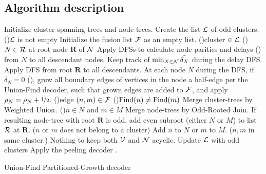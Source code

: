 \subsection{Algorithm description}\label{sec:pseudocode}
\begin{algorithm}[htb]
  \BlankLine
  \BlankLine
  Initialize cluster spanning-trees and node-trees.\;\label{algo:B1a}%
  Create the list $\mathcal{L}$ of odd clusters.\;
  \While(){$\mathcal{L}$ is not empty}{
    Initialize the fusion list $\mathcal{F}$ as an empty list.\;\label{algo:B1b}
    \For(){cluster $\in\mathcal{L}$ \label{algo:B2a}}{
      \For(){$N \in\mathcal{R}$ at root node $\mathbf{R}$ of $\mathcal{N}$}{
        Apply DFSs to calculate node parities and delays () from $N$ to all descendant nodes. Keep track of $\min_{X \in \mathcal{N}}{\tilde{\delta_X}}$ during the delay DFS.\;\label{algo:pdc}
      }
      Apply DFS from root $\mathbf{R}$ to all descendants. At each node $N$ during the DFS, if $\delta_N=0$ (), grow all boundary edges of vertices in the node a half-edge per the Union-Find decoder, such that grown edges are added to $\mathcal{F}$, and apply $\rho_N=\rho_N +\nicefrac{1}{2}$. \;\label{algo:grow}
    }
    \For(){edge $(n,m) \in \mathcal{F}$\label{algo:B3a}}{
      \eIf(){$\operatorname{Find}(n)\neq\operatorname{Find}(m)$}{
        Merge cluster-trees by Weighted $\operatorname{Union}$.\;
        \eIf(){$n \in N$ and $m \in M$\label{algo:joina}}{
          Merge node-trees by Odd-Rooted $\operatorname{Join}$. If resulting node-tree with root $\mathbf{R}$ is odd, add even subroot (either $N$ or $M$) to list $\mathcal{R}$ at $\mathbf{R}$.\;
        }($n$ or $m$ does not belong to a cluster){
          Add $n$ to $N$ or $m$ to $M$.\;\label{algo:joinb}
        }
      }($n,m$ in same cluster.\label{algo:dfa}){
        Nothing to keep both $\mathcal{V}$ and $\mathcal{N}$ acyclic.\;\label{algo:dfb} 
      }
    }
    Update $\mathcal{L}$ with odd clusters\; \label{algo:B3b}
  }
  Apply the peeling decoder \cite{delfosse2017linear}.\label{algo:B4a}
  \caption{Union-Find Partitioned-Growth \footnotesize decoder}\label{algo:ufbb}
\end{algorithm}

